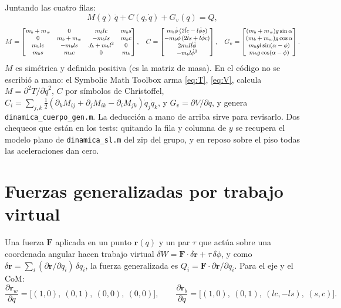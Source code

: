 \documentclass[11pt,a4paper]{article}
\newcommand{\code}[1]{\texttt{#1}}
\begin{document}
Juntando las cuatro filas:
\begin{equation}
  M(q)\,\ddot q + C(q,\dot q) + G_v(q) = Q,
  \label{eq:lag}
\end{equation}
\begin{equation}\small
  M = \begin{bmatrix} m_b+m_w & 0 & m_b l c & m_b s \\ 0 & m_b+m_w & -m_b l s & m_b c \\ m_b l c & -m_b l s & J_b + m_b l^2 & 0 \\ m_b s & m_b c & 0 & m_b \end{bmatrix},\quad
  C = \begin{bmatrix} m_b\dot\phi\,(2\dot l c - l\dot\phi s) \\ -m_b\dot\phi\,(2\dot l s + l\dot\phi c) \\ 2 m_b l\dot l\dot\phi \\ -m_b l\dot\phi^2 \end{bmatrix},\quad
  G_v = \begin{bmatrix} (m_b+m_w)g\sin\alpha \\ (m_b+m_w)g\cos\alpha \\ m_b g l\sin(\alpha-\phi) \\ m_b g\cos(\alpha-\phi) \end{bmatrix}.
\end{equation}
$M$ es simétrica y definida positiva (es la matriz de masa). En el código no se escribió a mano: el
Symbolic Math Toolbox arma \eqref{eq:T}, \eqref{eq:V}, calcula $M = \partial^2 T/\partial\dot q^2$,
$C$ por símbolos de Christoffel, $C_i = \sum_{j,k}\tfrac12(\partial_k M_{ij} + \partial_j M_{ik} - \partial_i M_{jk})\dot q_j\dot q_k$,
y $G_v = \partial V/\partial q$, y genera \code{dinamica\_cuerpo\_gen.m}. La deducción a mano de arriba
sirve para revisarlo. Dos chequeos que están en los tests: quitando la fila y columna de $y$ se
recupera el modelo plano de \code{dinamica\_sl.m} del zip del grupo, y en reposo sobre el piso
todas las aceleraciones dan cero.

\section{Fuerzas generalizadas por trabajo virtual}
\label{sec:Q}

Una fuerza $\bm F$ aplicada en un punto $\bm r(q)$ y un par $\tau$ que actúa sobre una coordenada
angular hacen trabajo virtual $\delta W = \bm F\cdot\delta\bm r + \tau\,\delta\phi$, y como
$\delta\bm r = \sum_i (\partial\bm r/\partial q_i)\,\delta q_i$, la fuerza generalizada es
$Q_i = \bm F\cdot\partial\bm r/\partial q_i$. Para el eje y el CoM:
\begin{equation}
  \frac{\partial\bm r_w}{\partial q} = \big[(1,0),\ (0,1),\ (0,0),\ (0,0)\big], \qquad
  \frac{\partial\bm r_b}{\partial q} = \big[(1,0),\ (0,1),\ (l c, -l s),\ (s, c)\big].
\end{equation}
\end{document}
